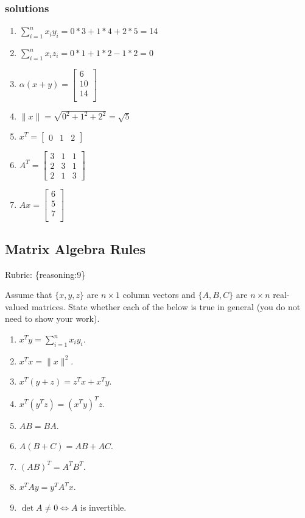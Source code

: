 \documentclass{article}
\def\rubric#1{\gre{Rubric: \{#1\}}}{}
\def\blu#1{{\color{blu}#1}}
\def\gre#1{{\color{gre}#1}}
\def\norm#1{\|#1\|}
\def\enum#1{\begin{enumerate}#1\end{enumerate}}
\begin{document}
\subsubsection{solutions}
\enum{
\item $\sum_{i=1}^n x_iy_i = 0*3 +1*4 + 2*5 = $14
\item $\sum_{i=1}^n x_iz_i = 0*1 +1*2 -1*2 = 0$
\item $\alpha(x+y) =\left[\begin{array}{c}
6\\
10\\
14\\
\end{array}\right]$
\item $\norm{x} =\sqrt{0^2+1^2+2^2} = \sqrt{5}$
\item $x^T = \left[\begin{array}{ccc}
0 & 1 & 2
\end{array}\right]$
\item $A^T = \left[\begin{array}{ccc}
3 & 1 & 1\\
2 & 3 & 1\\
2 & 1 & 3
\end{array}\right]$
\item $Ax = \left[\begin{array}{c}
6\\
5\\
7\\
\end{array}\right]$
}


\subsection{Matrix Algebra Rules}
\rubric{reasoning:9}

Assume that $\{x,y,z\}$ are $n \times 1$ column vectors and $\{A,B,C\}$ are $n \times n$ real-valued matrices. \blu{State whether each of the below is true in general} (you do not need to show your work).

\begin{enumerate}
\item $x^Ty = \sum_{i=1}^n x_iy_i$.
\item $x^Tx = \norm{x}^2$.
\item $x^T(y+z) = z^Tx + x^Ty$.
\item $x^T(y^Tz) = (x^Ty)^Tz$.
\item $AB=BA$.
\item $A(B + C) = AB + AC$.
\item $(AB)^T = A^TB^T$.
\item $x^TAy = y^TA^Tx$.
\item $\det A \neq 0 \iff A$ is invertible.
\end{enumerate}
\end{document}
